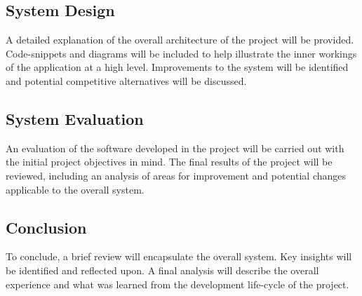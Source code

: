 \subsection{System Design}
A detailed explanation of the overall architecture of the project will be provided. Code-snippets and diagrams will be included to help illustrate the inner workings of the application at a high level. Improvements to the system will be identified and potential competitive alternatives will be discussed.
\subsection{System Evaluation}
An evaluation of the software developed in the project will be carried out with the initial project objectives in mind. The final results of the project will be reviewed, including an analysis of areas for improvement and potential changes applicable to the overall system.
\subsection{Conclusion}
To conclude, a brief review will encapsulate the overall system. Key insights will be identified and reflected upon. A final analysis will describe the overall experience and what was learned from the development life-cycle of the project.
